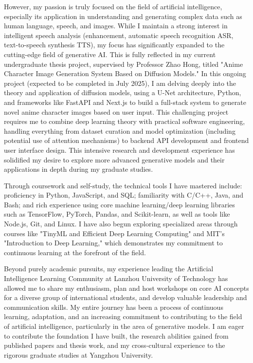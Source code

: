 \documentclass[12pt,a4paper]{article}
\begin{document}
\begin{CJK*}{UTF8}{gbsn}
However, my passion is truly focused on the field of artificial intelligence, especially its application in understanding and generating complex data such as human language, speech, and images. While I maintain a strong interest in intelligent speech analysis (enhancement, automatic speech recognition ASR, text-to-speech synthesis TTS), my focus has significantly expanded to the cutting-edge field of generative AI. This is fully reflected in my current undergraduate thesis project, supervised by Professor Zhao Hong, titled "Anime Character Image Generation System Based on Diffusion Models." In this ongoing project (expected to be completed in July 2025), I am delving deeply into the theory and application of diffusion models, using a U-Net architecture, Python, and frameworks like FastAPI and Next.js to build a full-stack system to generate novel anime character images based on user input. This challenging project requires me to combine deep learning theory with practical software engineering, handling everything from dataset curation and model optimization (including potential use of attention mechanisms) to backend API development and frontend user interface design. This intensive research and development experience has solidified my desire to explore more advanced generative models and their applications in depth during my graduate studies. \newline

Through coursework and self-study, the technical tools I have mastered include: proficiency in Python, JavaScript, and SQL; familiarity with C/C++, Java, and Bash; and rich experience using core machine learning/deep learning libraries such as TensorFlow, PyTorch, Pandas, and Scikit-learn, as well as tools like Node.js, Git, and Linux. I have also begun exploring specialized areas through courses like "TinyML and Efficient Deep Learning Computing" and MIT's "Introduction to Deep Learning," which demonstrates my commitment to continuous learning at the forefront of the field.  \newline

Beyond purely academic pursuits, my experience leading the Artificial Intelligence Learning Community at Lanzhou University of Technology has allowed me to share my enthusiasm, plan and host workshops on core AI concepts for a diverse group of international students, and develop valuable leadership and communication skills. My entire journey has been a process of continuous learning, adaptation, and an increasing commitment to contributing to the field of artificial intelligence, particularly in the area of generative models. I am eager to contribute the foundation I have built, the research abilities gained from published papers and thesis work, and my cross-cultural experience to the rigorous graduate studies at Yangzhou University.\newline


\end{CJK*}
\end{document}
